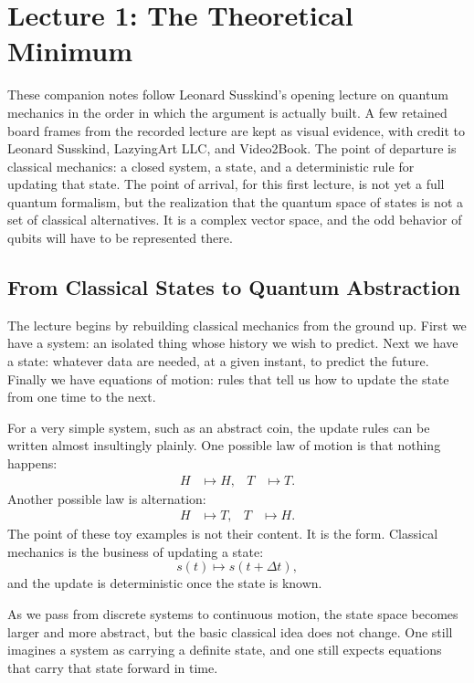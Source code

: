 \chapter{Lecture 1: The Theoretical Minimum}

These companion notes follow Leonard Susskind's opening lecture on quantum mechanics in the order in which the argument is actually built. A few retained board frames from the recorded lecture are kept as visual evidence, with credit to Leonard Susskind, LazyingArt LLC, and Video2Book. The point of departure is classical mechanics: a closed system, a state, and a deterministic rule for updating that state. The point of arrival, for this first lecture, is not yet a full quantum formalism, but the realization that the quantum space of states is not a set of classical alternatives. It is a complex vector space, and the odd behavior of qubits will have to be represented there.

\section{From Classical States to Quantum Abstraction}

The lecture begins by rebuilding classical mechanics from the ground up. First we have a system: an isolated thing whose history we wish to predict. Next we have a state: whatever data are needed, at a given instant, to predict the future. Finally we have equations of motion: rules that tell us how to update the state from one time to the next.

For a very simple system, such as an abstract coin, the update rules can be written almost insultingly plainly. One possible law of motion is that nothing happens:
\begin{align}
H &\mapsto H, &
T &\mapsto T.
\end{align}
Another possible law is alternation:
\begin{align}
H &\mapsto T, &
T &\mapsto H.
\end{align}
The point of these toy examples is not their content. It is the form. Classical mechanics is the business of updating a state:
\begin{equation}
s(t)\longmapsto s(t+\Delta t),
\end{equation}
and the update is deterministic once the state is known.

As we pass from discrete systems to continuous motion, the state space becomes larger and more abstract, but the basic classical idea does not change. One still imagines a system as carrying a definite state, and one still expects equations that carry that state forward in time.

